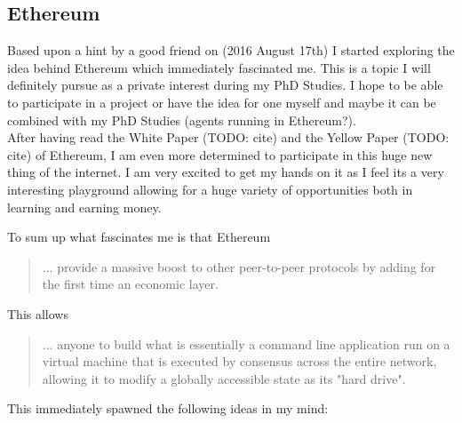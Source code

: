 \subsection{Ethereum}
Based upon a hint by a good friend on (2016 August 17th) I started exploring the idea behind Ethereum which immediately fascinated me. This is a topic I will definitely pursue as a private interest during my PhD Studies. I hope to be able to participate in a project or have the idea for one myself and maybe it can be combined with my PhD Studies (agents running in Ethereum?). \\
After having read the White Paper (TODO: cite) and the Yellow Paper (TODO: cite) of Ethereum, I am even more determined to participate in this huge new thing of the internet. I am very excited to get my hands on it as I feel its a very interesting playground allowing for a huge variety of opportunities both in learning and earning money. \bigskip

To sum up what fascinates me is that Ethereum

\begin{quote}
... provide a massive boost to other peer-to-peer protocols by adding for the first time an economic layer.
\end{quote}

This allows 

\begin{quote}
... anyone to build what is essentially a command line application run on a virtual machine that is executed by consensus across the entire network, allowing it to modify a globally accessible state as its "hard drive".
\end{quote}

This immediately spawned the following ideas in my mind:

